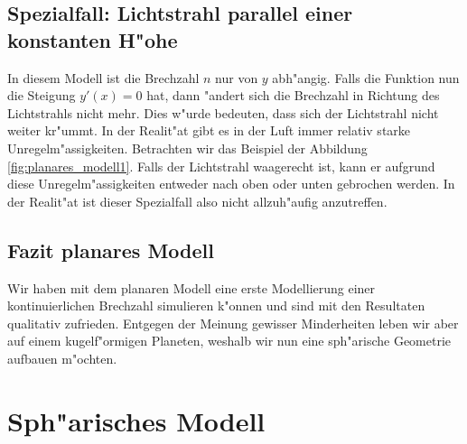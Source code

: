 \begin{refsection}
\subsection{Spezialfall: Lichtstrahl parallel einer konstanten H"ohe \label{ch:spezialfall}}
In diesem Modell ist die Brechzahl $n$ nur von $y$ abh"angig. 
Falls die Funktion nun die Steigung $y'(x) = 0$ hat, dann "andert sich die Brechzahl in Richtung des Lichtstrahls nicht mehr.
Dies w"urde bedeuten, dass sich der Lichtstrahl nicht weiter kr"ummt. 
In der Realit"at gibt es in der Luft immer relativ starke Unregelm"assigkeiten. 
Betrachten wir das Beispiel der Abbildung \ref{fig:planares_modell1}. 
Falls der Lichtstrahl waagerecht ist, kann er aufgrund diese Unregelm"assigkeiten entweder nach oben oder unten gebrochen werden. 
In der Realit"at ist dieser Spezialfall also nicht allzuh"aufig anzutreffen.

\subsection{Fazit planares Modell}
Wir haben mit dem planaren Modell eine erste Modellierung einer kontinuierlichen Brechzahl simulieren k"onnen und sind mit den Resultaten qualitativ zufrieden. 
Entgegen der Meinung gewisser Minderheiten\cite{licht:flatearthsociety} leben wir aber auf einem kugelf"ormigen Planeten, weshalb wir nun eine sph"arische Geometrie aufbauen m"ochten.

\section{Sph"arisches Modell}


\end{refsection}
